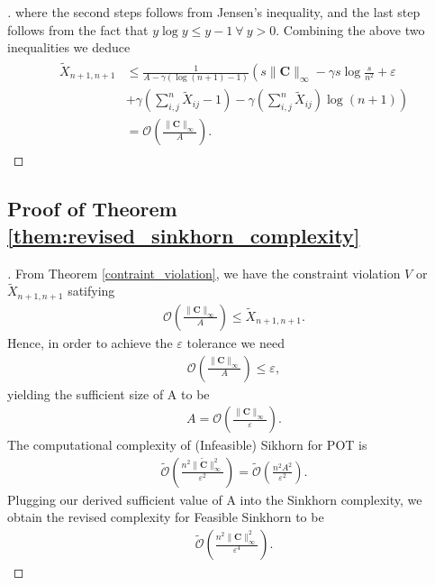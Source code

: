 \begin{proof}[\unskip \nopunct]
where the second steps follows from Jensen's inequality, and the last step follows from the fact that $y\log{y} \leq y-1 \: \forall \: y > 0$. Combining the above two inequalities we deduce
\begin{align*}
    \begin{split}
        \tilde{X}_{n+1,n+1} &\leq \frac{1}{A - \gamma (\log(n+1)-1)} \left( s \|\mathbf{C}\|_\infty - \gamma s \log\frac{s}{n^2} + \varepsilon \right. \\
        &\left.+ \gamma \left( \sum^{n}_{i,j} \tilde{X}_{ij} - 1 \right) - \gamma \left(\sum^{n}_{i,j} \tilde{X}_{ij}\right) \log \left( n+1\right) \right) \\
        &=\mathcal{O}\left(\frac{\|\mathbf{C}\|_\infty}{A}\right).
    \end{split}
\end{align*}
\end{proof}

\subsection{Proof of Theorem \ref{them:revised_sinkhorn_complexity}}
\begin{proof}[\nopunct]
From Theorem \ref{contraint_violation}, we have the constraint violation $V$ or $\tilde{X}_{n+1,n+1}$ satifying
\begin{align*}
    \mathcal{O}\left(\frac{\|\mathbf{C}\|_\infty}{A}\right) \leq  \tilde{X}_{n+1,n+1}.
\end{align*}
Hence, in order to achieve the $\varepsilon$ tolerance we need
\begin{align*}
    \mathcal{O}\left(\frac{\|\mathbf{C}\|_\infty}{A}\right) \leq \varepsilon,
\end{align*}
yielding the sufficient size of A to be
\begin{align*}
   A = \mathcal{O}\left(\frac{\|\mathbf{C}\|_\infty}{\varepsilon}\right).
\end{align*}
The computational complexity of (Infeasible) Sikhorn for POT \citep{nhatho-mmpot} is 
\begin{align*}
    \tilde{\mathcal{O}}\left(\frac{n^2 \|\mathbf{\tilde{C}}\|_\infty^2}{\varepsilon^2}\right) = \tilde{\mathcal{O}}\left(\frac{n^2 A^2}{\varepsilon^2}\right).
\end{align*}
Plugging our derived sufficient value of A into the Sinkhorn complexity, we obtain the revised complexity for Feasible Sinkhorn to be
\begin{align*}
    \tilde{\mathcal{O}}\left(\frac{n^2 \|\mathbf{C}\|_\infty^2}{\varepsilon^4}\right).
\end{align*}
\end{proof}
